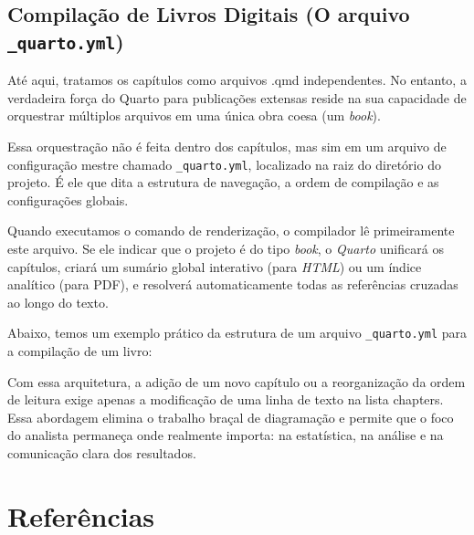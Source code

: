 \documentclass[
  brazilian,
  letterpaper,
  DIV=11,
  numbers=noendperiod]{scrreprt}
\begin{document}
\section{\texorpdfstring{Compilação de Livros Digitais (O arquivo
\texttt{\_quarto.yml})}{Compilação de Livros Digitais (O arquivo \_quarto.yml)}}\label{compilauxe7uxe3o-de-livros-digitais-o-arquivo-_quarto.yml}

Até aqui, tratamos os capítulos como arquivos .qmd independentes. No
entanto, a verdadeira força do Quarto para publicações extensas reside
na sua capacidade de orquestrar múltiplos arquivos em uma única obra
coesa (um \emph{book}).

Essa orquestração não é feita dentro dos capítulos, mas sim em um
arquivo de configuração mestre chamado \texttt{\_quarto.yml}, localizado
na raiz do diretório do projeto. É ele que dita a estrutura de
navegação, a ordem de compilação e as configurações globais.

Quando executamos o comando de renderização, o compilador lê
primeiramente este arquivo. Se ele indicar que o projeto é do tipo
\emph{book}, o \emph{Quarto} unificará os capítulos, criará um sumário
global interativo (para \emph{HTML}) ou um índice analítico (para PDF),
e resolverá automaticamente todas as referências cruzadas ao longo do
texto.

Abaixo, temos um exemplo prático da estrutura de um arquivo
\texttt{\_quarto.yml} para a compilação de um livro:

Com essa arquitetura, a adição de um novo capítulo ou a reorganização da
ordem de leitura exige apenas a modificação de uma linha de texto na
lista chapters. Essa abordagem elimina o trabalho braçal de diagramação
e permite que o foco do analista permaneça onde realmente importa: na
estatística, na análise e na comunicação clara dos resultados.


\chapter*{Referências}\label{referuxeancias}

\end{document}
